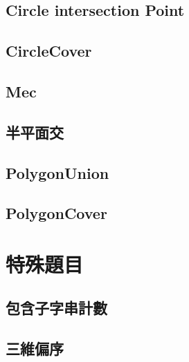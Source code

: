 \subsection{Circle intersection Point}


\subsection{CircleCover}


\subsection{Mec}


\subsection{半平面交}


\subsection{PolygonUnion}


\subsection{PolygonCover}


\section{特殊題目}

\subsection{包含子字串計數}


\subsection{三維偏序}

